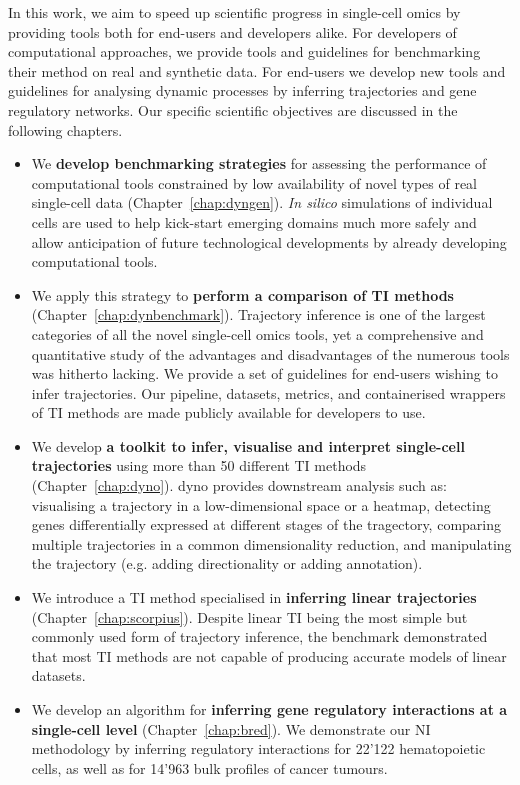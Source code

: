 In this work, we aim to speed up scientific progress in single-cell omics by providing tools both for end-users and developers alike. For developers of computational approaches, we provide tools and guidelines for benchmarking their method on real and synthetic data. For end-users we develop new tools and guidelines for analysing dynamic processes by inferring trajectories and gene regulatory networks. Our specific scientific objectives are discussed in the following chapters.

\begin{itemize}
	\item We \textbf{develop benchmarking strategies} for assessing the performance of computational tools constrained by low availability of novel types of real single-cell data (Chapter~\ref{chap:dyngen}). \textit{In silico} simulations of individual cells are used to help kick-start emerging domains much more safely and allow anticipation of future technological developments by already developing computational tools.
	\item We apply this strategy to \textbf{perform a comparison of TI methods} (Chapter~\ref{chap:dynbenchmark}). Trajectory inference is one of the largest categories of all the novel single-cell omics tools, yet a comprehensive and quantitative study of the advantages and disadvantages of the numerous tools was hitherto lacking. We provide a set of guidelines for end-users wishing to infer trajectories. Our pipeline, datasets, metrics, and containerised wrappers of TI methods are made publicly available for developers to use.
	\item We develop \textbf{a toolkit to infer, visualise and interpret single-cell trajectories} using more than 50 different TI methods (Chapter~\ref{chap:dyno}). dyno provides downstream analysis such as: visualising a trajectory in a low-dimensional space or a heatmap, detecting genes differentially expressed at different stages of the tragectory, comparing multiple trajectories in a common dimensionality reduction, and manipulating the trajectory (e.g. adding directionality or adding annotation).
	\item We introduce a TI method specialised in \textbf{inferring linear trajectories} (Chapter~\ref{chap:scorpius}). Despite linear TI being the most simple but commonly used form of trajectory inference, the benchmark demonstrated that most TI methods are not capable of producing accurate models of linear datasets.
	\item We develop an algorithm for  \textbf{inferring gene regulatory interactions at a single-cell level} (Chapter~\ref{chap:bred}). We demonstrate our NI methodology by inferring regulatory interactions for 22'122 hematopoietic cells, as well as for 14'963 bulk profiles of cancer tumours.

\end{itemize}
